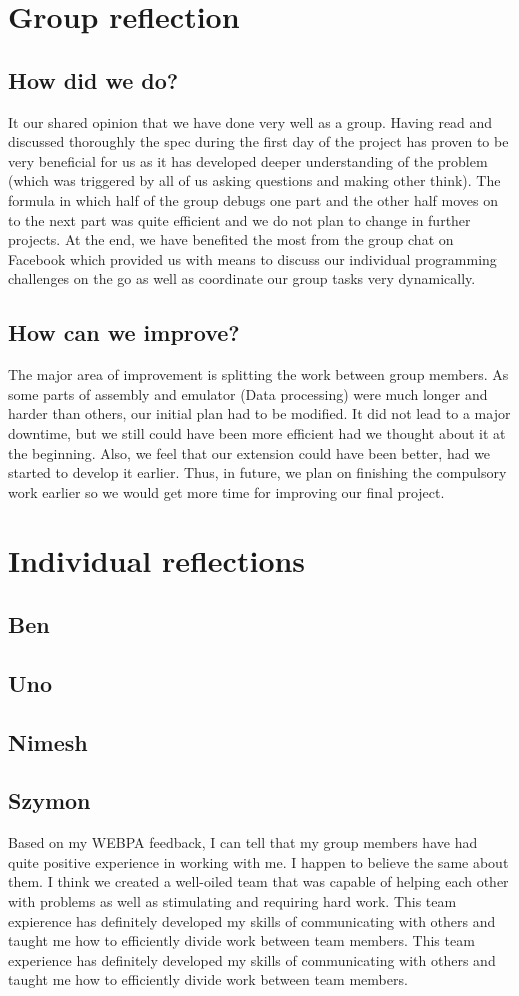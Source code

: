 \documentclass[11pt]{article}
\begin{document}
\section{Group reflection}
\subsection{How did we do?}
It our shared opinion that we have done very well as a group. Having read and discussed thoroughly  the spec during the first day of the project has proven to be very beneficial for us as it has developed deeper understanding of the problem (which was triggered by all of us asking questions and making other think). The formula in which half of the group debugs one part and the other half moves on to the next part was quite efficient and we do not plan to change in further projects. At the end, we have benefited the most from the group chat on Facebook which provided us with means to discuss our individual programming challenges on the go as well as coordinate our group tasks very dynamically. 
\subsection{How can we improve?}
The major area of improvement is splitting the work between group members. As some parts of assembly and emulator (Data processing) were much longer and harder than others, our initial plan had to be modified. It did not lead to a major downtime, but we still could have been more efficient had we thought about it at the beginning. Also, we feel that our extension could have been better, had we started to develop it earlier. Thus, in future, we plan on finishing the compulsory work earlier so we would get more time for improving our final project.
\section{Individual reflections}

\subsection{Ben}
\subsection{Uno}
\subsection{Nimesh}
\subsection{Szymon}
Based on my WEBPA feedback, I can tell that my group members have had quite positive experience in working with me. I happen to believe the same about them. I think we created a well-oiled team that was capable of helping each other with problems as well as stimulating and requiring hard work. This team expierence has definitely developed my skills of communicating with others and taught me how to efficiently divide work between team members. This team experience has definitely developed my skills of communicating with others and taught me how to efficiently divide work between team members.
\end{document}
